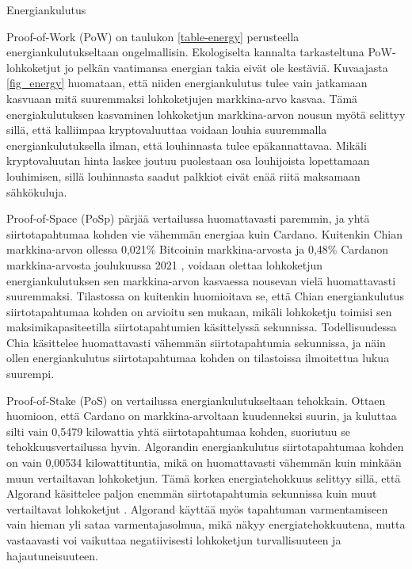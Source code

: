 \begin{section}{Energiankulutus\label{energiankulutus}}

Proof-of-Work (PoW) on taulukon \ref{table-energy} perusteella energiankulutukseltaan ongelmallisin. Ekologiselta kannalta tarkasteltuna PoW-lohkoketjut jo pelkän vaatimansa energian takia eivät ole kestäviä. Kuvaajasta \ref{fig_energy} huomataan, että niiden energiankulutus tulee vain jatkamaan kasvuaan mitä suuremmaksi lohkoketjujen markkina-arvo kasvaa. Tämä energiakulutuksen kasvaminen lohkoketjun markkina-arvon nousun myötä selittyy sillä, että kalliimpaa kryptovaluuttaa voidaan louhia suuremmalla energiankulutuksella ilman, että louhinnasta tulee epäkannattavaa. Mikäli kryptovaluutan hinta laskee joutuu puolestaan osa louhijoista lopettamaan louhimisen, sillä louhinnasta saadut palkkiot eivät enää riitä maksamaan sähkökuluja.

Proof-of-Space (PoSp) pärjää vertailussa huomattavasti paremmin, ja yhtä siirtotapahtumaa kohden vie vähemmän energiaa kuin Cardano. Kuitenkin Chian markkina-arvon ollessa 0,021\% Bitcoinin markkina-arvosta ja 0,48\% Cardanon markkina-arvosta joulukuussa 2021 \cite{Coingecko}, voidaan olettaa lohkoketjun energiankulutuksen sen markkina-arvon kasvaessa nousevan vielä huomattavasti suuremmaksi. Tilastossa on kuitenkin huomioitava se, että Chian energiankulutus siirtotapahtumaa kohden on arvioitu sen mukaan, mikäli lohkoketju toimisi sen maksimikapasiteetilla siirtotapahtumien käsittelyssä sekunnissa. Todellisuudessa Chia käsittelee huomattavasti vähemmän siirtotapahtumia sekunnissa, ja näin ollen energiankulutus siirtotapahtumaa kohden on tilastoissa ilmoitettua lukua suurempi.

Proof-of-Stake (PoS) on vertailussa energiankulutukseltaan tehokkain. Ottaen huomioon, että Cardano on markkina-arvoltaan kuudenneksi suurin, ja kuluttaa silti vain 0,5479 kilowattia yhtä siirtotapahtumaa kohden, suoriutuu se tehokkuusvertailussa hyvin. Algorandin energiankulutus siirtotapahtumaa kohden on vain 0,00534 kilowattituntia, mikä on huomattavasti vähemmän kuin minkään muun vertailtavan lohkoketjun. Tämä korkea energiatehokkuus selittyy sillä, että Algorand käsittelee paljon enemmän siirtotapahtumia sekunnissa kuin muut vertailtavat lohkoketjut \cite{algorand-energy-2}. Algorand käyttää myös tapahtuman varmentamiseen vain hieman yli sataa \cite{algorand-energy} varmentajasolmua, mikä näkyy energiatehokkuutena, mutta vastaavasti voi vaikuttaa negatiivisesti lohkoketjun turvallisuuteen ja hajautuneisuuteen.

\end{section}